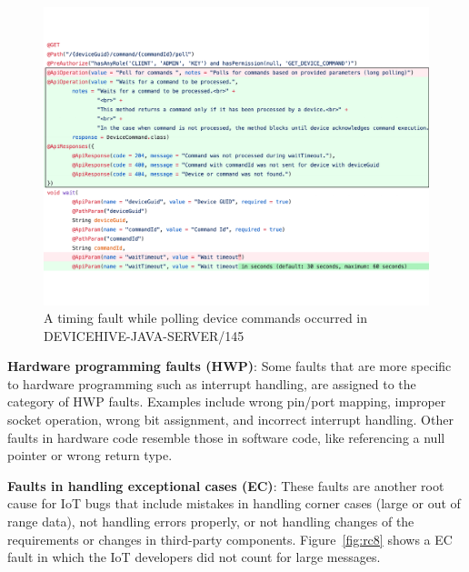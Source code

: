  \begin{figure}[ht]
  \centering
   \includegraphics[width=\linewidth]{imgs/TM}
  \caption{A timing fault while polling device commands occurred in DEVICEHIVE-JAVA-SERVER/145}
  \label{fig:tm}
\end{figure}


\textbf{Hardware programming faults (HWP)}: Some faults that are more specific to hardware programming such as interrupt handling, are assigned to the category of HWP faults. Examples include wrong pin/port mapping, improper socket operation, wrong bit assignment, and incorrect interrupt handling. Other faults in hardware code resemble those in software code, like referencing a null pointer or wrong return type.

\textbf{Faults in handling exceptional cases (EC)}: These faults are another root cause for IoT bugs that include mistakes in handling corner cases (large or out of range data), not handling errors properly, or not handling changes of the requirements or changes in third-party components. Figure~\autoref{fig:rc8} shows a EC fault in which the IoT developers did not count for large messages.
 
